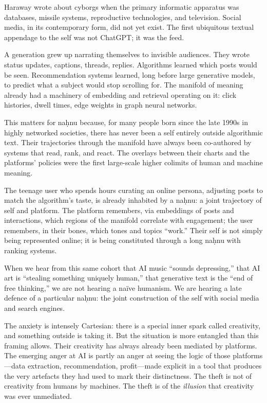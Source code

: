 \documentclass[12pt,a4paper]{article}
\begin{document}
Haraway wrote about cyborgs when the primary informatic apparatus was databases, missile systems, reproductive technologies, and television. Social media, in its contemporary form, did not yet exist. The first ubiquitous textual appendage to the self was not ChatGPT; it was the feed.

A generation grew up narrating themselves to invisible audiences. They wrote status updates, captions, threads, replies. Algorithms learned which posts would be seen. Recommendation systems learned, long before large generative models, to predict what a subject would stop scrolling for. The manifold of meaning already had a machinery of embedding and retrieval operating on it: click histories, dwell times, edge weights in graph neural networks.

This matters for na\d{h}nu because, for many people born since the late 1990s in highly networked societies, there has never been a self entirely outside algorithmic text. Their trajectories through the manifold have always been co-authored by systems that read, rank, and react. The overlays between their charts and the platforms' policies were the first large-scale higher colimits of human and machine meaning.

The teenage user who spends hours curating an online persona, adjusting posts to match the algorithm's taste, is already inhabited by a na\d{h}nu: a joint trajectory of self and platform. The platform remembers, via embeddings of posts and interactions, which regions of the manifold correlate with engagement; the user remembers, in their bones, which tones and topics ``work.'' Their self is not simply being represented online; it is being constituted through a long na\d{h}nu with ranking systems.

When we hear from this same cohort that AI music ``sounds depressing,'' that AI art is ``stealing something uniquely human,'' that generative text is the ``end of free thinking,'' we are not hearing a na\"{i}ve humanism. We are hearing a late defence of a particular na\d{h}nu: the joint construction of the self with social media and search engines.

The anxiety is intensely Cartesian: there is a special inner spark called creativity, and something outside is taking it. But the situation is more entangled than this framing allows. Their creativity has always already been mediated by platforms. The emerging anger at AI is partly an anger at seeing the logic of those platforms---data extraction, recommendation, profit---made explicit in a tool that produces the very artefacts they had used to mark their distinctness. The theft is not of creativity from humans by machines. The theft is of the \emph{illusion} that creativity was ever unmediated.
\end{document}
